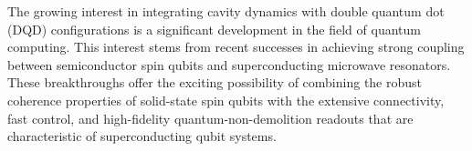 \documentclass[12pt]{report}
\begin{document}


The growing interest in integrating cavity dynamics with double quantum dot (DQD) configurations is a significant development in the field of quantum computing. This interest stems from recent successes in achieving strong coupling between semiconductor spin qubits and superconducting microwave resonators. These breakthroughs offer the exciting possibility of combining the robust coherence properties of solid-state spin qubits with the extensive connectivity, fast control, and high-fidelity quantum-non-demolition readouts that are characteristic of superconducting qubit systems.
\end{document}
